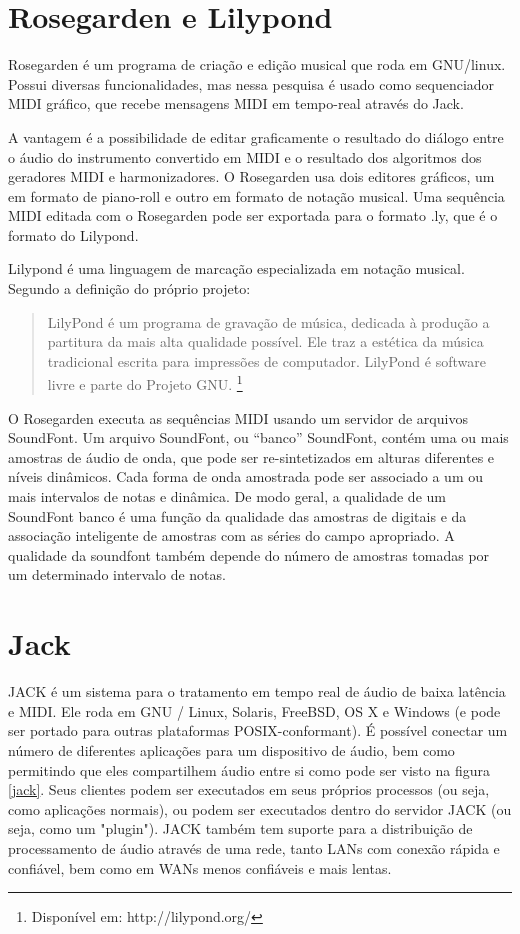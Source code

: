 \documentclass{ppgmus}
\begin{document}
\section{Rosegarden e Lilypond}

Rosegarden é um programa de criação e edição musical que roda em GNU/linux.
Possui diversas funcionalidades, mas nessa pesquisa é usado como sequenciador
MIDI gráfico, que recebe mensagens MIDI em tempo-real através do Jack.

A vantagem é a possibilidade de editar graficamente o resultado do diálogo entre
o áudio do instrumento convertido em MIDI e o resultado dos algoritmos dos geradores
MIDI e harmonizadores. O Rosegarden usa dois editores gráficos, um em formato de piano-roll
e outro em formato de notação musical. Uma sequência MIDI editada com o Rosegarden
pode ser exportada para o formato .ly, que é o formato do Lilypond.

Lilypond é uma linguagem de marcação especializada em notação musical. Segundo
a definição do próprio projeto:

\begin{quote}
 LilyPond é um programa de gravação de música, dedicada à produção a partitura da mais alta qualidade possível. 
Ele traz a estética da música tradicional escrita para impressões de computador. LilyPond é software livre e 
parte do Projeto GNU. \footnote{Disponível em: http://lilypond.org/}
\end{quote} 

O Rosegarden executa as sequências MIDI usando um servidor de arquivos SoundFont.
Um arquivo SoundFont, ou ``banco'' SoundFont, contém uma ou mais amostras de áudio de onda,
que pode ser re-sintetizados em alturas diferentes e níveis dinâmicos. Cada forma de onda amostrada pode ser
associado a um ou mais intervalos de notas e dinâmica. De modo geral, a qualidade de um
SoundFont banco é uma função da qualidade das amostras de digitais e da associação inteligente
de amostras com as séries do campo apropriado. A qualidade da soundfont também depende do número de amostras
tomadas por um determinado intervalo de notas. 

\section{Jack}


JACK é um sistema para o tratamento em tempo real de áudio de baixa latência e MIDI. 
Ele roda em GNU / Linux, Solaris, FreeBSD, OS X e Windows (e pode ser portado para outras plataformas 
POSIX-conformant). É possível conectar um número de diferentes aplicações para um dispositivo de áudio, 
bem como permitindo que eles compartilhem áudio entre si como pode ser visto na figura \ref{jack}. 
Seus clientes podem ser executados em seus próprios 
processos (ou seja, como aplicações normais), ou podem ser executados dentro do servidor JACK 
(ou seja, como um "plugin"). JACK também tem suporte para a distribuição de processamento de áudio através de 
uma rede, tanto LANs com conexão rápida e confiável, bem como em WANs menos confiáveis e mais lentas.
\end{document}
